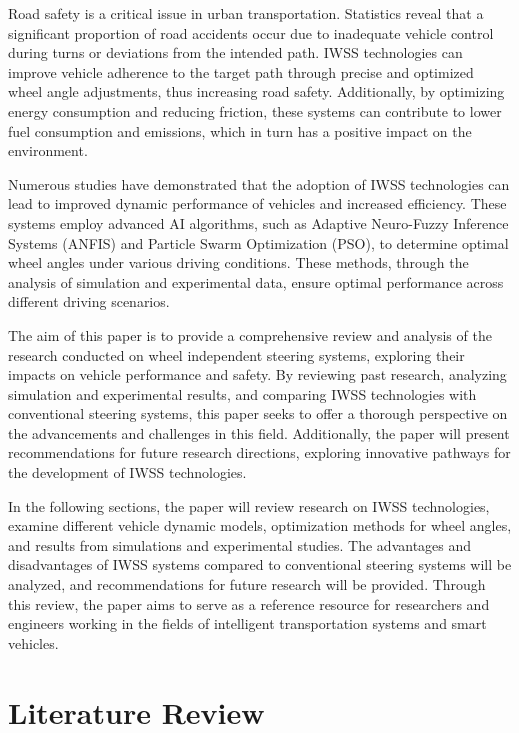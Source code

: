 \documentclass[a4paper,10pt]{article}
\begin{document}
        Road safety is a critical issue in urban transportation. Statistics reveal that a significant proportion of road accidents occur due to inadequate vehicle control during turns or deviations from the intended path. IWSS technologies can improve vehicle adherence to the target path through precise and optimized wheel angle adjustments, thus increasing road safety. Additionally, by optimizing energy consumption and reducing friction, these systems can contribute to lower fuel consumption and emissions, which in turn has a positive impact on the environment.

        Numerous studies have demonstrated that the adoption of IWSS technologies can lead to improved dynamic performance of vehicles and increased efficiency. These systems employ advanced AI algorithms, such as Adaptive Neuro-Fuzzy Inference Systems (ANFIS) and Particle Swarm Optimization (PSO), to determine optimal wheel angles under various driving conditions. These methods, through the analysis of simulation and experimental data, ensure optimal performance across different driving scenarios.

        The aim of this paper is to provide a comprehensive review and analysis of the research conducted on wheel independent steering systems, exploring their impacts on vehicle performance and safety. By reviewing past research, analyzing simulation and experimental results, and comparing IWSS technologies with conventional steering systems, this paper seeks to offer a thorough perspective on the advancements and challenges in this field. Additionally, the paper will present recommendations for future research directions, exploring innovative pathways for the development of IWSS technologies.

        In the following sections, the paper will review research on IWSS technologies, examine different vehicle dynamic models, optimization methods for wheel angles, and results from simulations and experimental studies. The advantages and disadvantages of IWSS systems compared to conventional steering systems will be analyzed, and recommendations for future research will be provided. Through this review, the paper aims to serve as a reference resource for researchers and engineers working in the fields of intelligent transportation systems and smart vehicles.

    \section{Literature Review}
\end{document}
